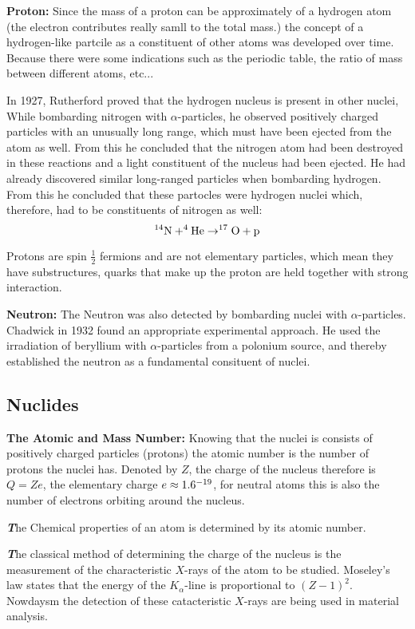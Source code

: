 \documentclass[10pt,a4paper]{article}
\newenvironment{callout}
	{\begin{calloutbox}\color{charcoal}\textbf\textit}
	{\end{calloutbox}}
\begin{document}
\textbf{Proton:} Since the mass of a proton can be approximately of a hydrogen atom (the electron contributes really samll to the total mass.) the concept of a hydrogen-like partcile as a constituent of other atoms was developed over time. Because there were some indications such as the periodic table, the ratio of mass between different atoms, etc... 


In 1927, Rutherford proved that the hydrogen nucleus is present in other nuclei, While bombarding nitrogen with $\alpha$-particles, he observed positively charged particles with an unusually long range, which must have been ejected from the atom as well. From this he concluded that the nitrogen atom had been destroyed in these reactions and a light constituent of the nucleus had been ejected. He had already discovered similar long-ranged particles when bombarding hydrogen. From this he concluded that these partocles were hydrogen nuclei which, therefore, had to be constituents of nitrogen as well:
$$
^{14}\text{N} + ^4\text{He} \rightarrow ^{17}\text O + \text p
$$ 

Protons are spin $\frac12$ fermions and are not elementary particles, which mean they have substructures, quarks that make up the proton are held together with strong interaction.

\textbf{Neutron:} The Neutron was also detected by bombarding nuclei with $\alpha$-particles. Chadwick in 1932 found an appropriate experimental approach. He used the irradiation of beryllium with $\alpha$-particles from a polonium source, and thereby established the neutron as a fundamental consituent of nuclei.

\subsection{Nuclides}

\textbf{The Atomic and Mass Number: } Knowing that the nuclei is consists of positively charged particles (protons) the atomic number is the number of protons the nuclei has. Denoted by $Z$, the charge of the nucleus therefore is $Q = Ze$, the elementary charge $e \approx 1.6 \time 10^{-19}$, for neutral atoms this is also the number of electrons orbiting around the nucleus. 

\begin{callout}
    The Chemical properties of an atom is determined by its atomic number.
\end{callout}
\begin{callout}
    The classical method of determining the charge of the nucleus is the measurement of the characteristic $X$-rays of the atom to be studied. Moseley's law states that the energy of the $K_\alpha$-line is proportional to $(Z-1)^2$. Nowdaysm the detection of these catacteristic $X$-rays are being used in material analysis.
\end{callout}
\end{document}
